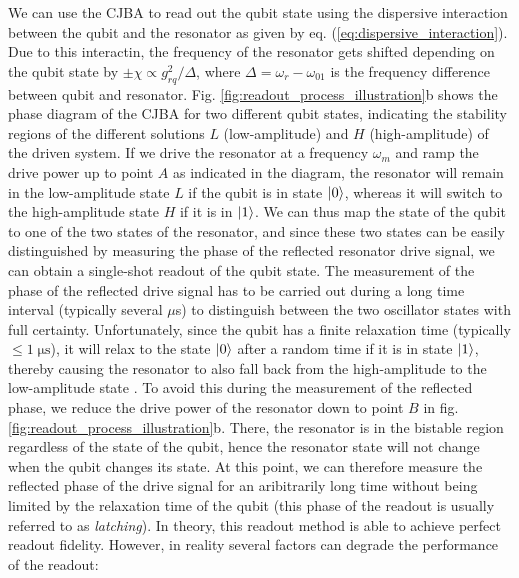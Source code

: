 We can use the CJBA to read out the qubit state using the dispersive interaction between the qubit and the resonator as given by eq. (\ref{eq:dispersive_interaction}). Due to this interactin, the frequency of the resonator gets shifted depending on the qubit state by $\pm\chi\propto g_{rq}^2/\Delta$, where $\Delta=\omega_r-\omega_{01}$ is the frequency difference between qubit and resonator. Fig. \ref{fig:readout_process_illustration}b shows the phase diagram of the CJBA for two different qubit states, indicating the stability regions of the different solutions $L$ (low-amplitude) and $H$ (high-amplitude) of the driven system. If we drive the resonator at a frequency $\omega_m$ and ramp the drive power up to point $A$ as indicated in the diagram, the resonator will remain in the low-amplitude state $L$ if the qubit is in state $\left| 0 \right>$, whereas it will switch to the high-amplitude state $H$ if it is in $\left| 1 \right>$. We can thus map the state of the qubit to one of the two states of the resonator, and since these two states can be easily distinguished by measuring the phase of the reflected resonator drive signal, we can obtain a single-shot readout of the qubit state. The measurement of the phase of the reflected drive signal has to be carried out during a long time interval (typically several $\mu$s) to distinguish between the two oscillator states with full certainty. Unfortunately, since the qubit has a finite relaxation time (typically $\le 1\;\mathrm{\mu s}$), it will relax to the state $\left| 0 \right>$ after a random time if it is in state $\left| 1 \right>$, thereby causing the resonator to also fall back from the high-amplitude to the low-amplitude state . To avoid this during the measurement of the reflected phase, we reduce the drive power of the resonator down to point $B$ in fig. \ref{fig:readout_process_illustration}b. There, the resonator is in the bistable region regardless of the state of the qubit, hence the resonator state will not change when the qubit changes its state. At this point, we can therefore measure the reflected phase of the drive signal for an aribitrarily long time without being limited by the relaxation time of the qubit (this phase of the readout is usually referred to as {\it latching}). In theory, this readout method is able to achieve perfect readout fidelity. However, in reality several factors can degrade the performance of the readout:

